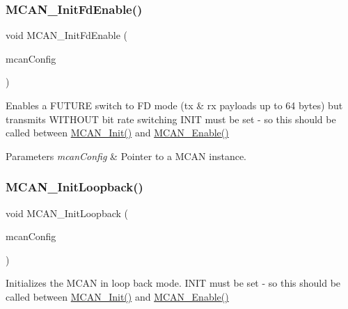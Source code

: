 \subsubsection{\texorpdfstring{MCAN\_InitFdEnable()}{MCAN\_InitFdEnable()}}
{\footnotesize\ttfamily void M\+C\+A\+N\+\_\+\+Init\+Fd\+Enable (\begin{DoxyParamCaption}\item[{const \mbox{\hyperlink{structMCan__ConfigTag}{M\+Can\+\_\+\+Config\+Type}} $\ast$}]{mcan\+Config }\end{DoxyParamCaption})}



Enables a F\+U\+T\+U\+RE switch to FD mode (tx \& rx payloads up to 64 bytes) but transmits W\+I\+T\+H\+O\+UT bit rate switching I\+N\+IT must be set -\/ so this should be called between \mbox{\hyperlink{group__can__module_ga9b35cd79fb5eeec8cf1ba7247b25a646}{M\+C\+A\+N\+\_\+\+Init()}} and \mbox{\hyperlink{group__can__module_ga712fa4d48e3fd1365a08a91cd3932104}{M\+C\+A\+N\+\_\+\+Enable()}} 


\begin{DoxyParams}{Parameters}
{\em mcan\+Config} & Pointer to a M\+C\+AN instance. \\
\hline
\end{DoxyParams}
\mbox{\label{group__can__module_ga97adc21dfdf714818018ae78b51bf02e}} 
\subsubsection{\texorpdfstring{MCAN\_InitLoopback()}{MCAN\_InitLoopback()}}
{\footnotesize\ttfamily void M\+C\+A\+N\+\_\+\+Init\+Loopback (\begin{DoxyParamCaption}\item[{const \mbox{\hyperlink{structMCan__ConfigTag}{M\+Can\+\_\+\+Config\+Type}} $\ast$}]{mcan\+Config }\end{DoxyParamCaption})}



Initializes the M\+C\+AN in loop back mode. I\+N\+IT must be set -\/ so this should be called between \mbox{\hyperlink{group__can__module_ga9b35cd79fb5eeec8cf1ba7247b25a646}{M\+C\+A\+N\+\_\+\+Init()}} and \mbox{\hyperlink{group__can__module_ga712fa4d48e3fd1365a08a91cd3932104}{M\+C\+A\+N\+\_\+\+Enable()}} 


